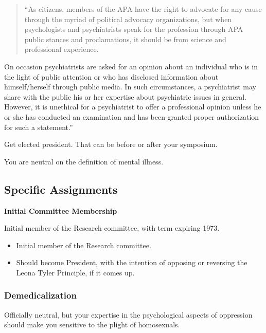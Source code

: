 \begin{refsection}
\begin{quote}

“As citizens, members of the APA have the right to advocate for any cause through the myriad of political advocacy organizations, but when psychologists and psychiatrists speak for the profession through APA public stances and proclamations, it should be from science and professional experience. 
\end{quote}

On occasion psychiatrists are asked for an opinion about an individual who is in the light of public attention or who has disclosed information about himself\slash herself through public media. In such circumstances, a psychiatrist may share with the public his or her expertise about psychiatric issues in general. However, it is unethical for a psychiatrist to offer a professional opinion unless he or she has conducted an examination and has been granted proper authorization for such a statement.”

Get elected president. That can be before or after your symposium.

You are neutral on the definition of mental illness. 

\subsection{Specific Assignments}
\label{specificassignments}

\textbf{Initial Committee Membership}\begin{service}[Clark]\label{service:clark}
Initial member of the Research committee, with term expiring 1973. 
\end{service}

\begin{itemize}
\item Initial member of the Research committee.

\item Should become President, with the intention of opposing or reversing the Leona Tyler Principle, if it comes up.

\end{itemize}

\subsubsection{Demedicalization}
\label{demedicalization}

Officially neutral, but your expertise in the psychological aspects of oppression should make you sensitive to the plight of homosexuals.


\end{refsection}

